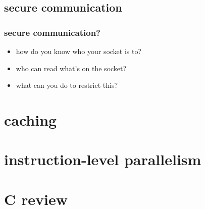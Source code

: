 

\subsection{secure communication}

\begin{frame}\frametitle{secure communication?}
    \begin{itemize}
    \item how do you know who your socket is to?
    \item who can read what's on the socket?
    \item what can you do to restrict this?
    \end{itemize}
\end{frame}

\section{caching}




\section{instruction-level parallelism}



\section{C review}



